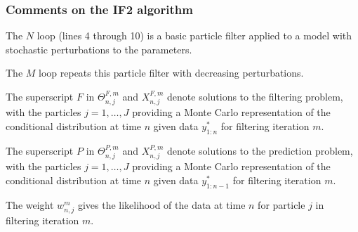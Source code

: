 \documentclass{beamer}\usepackage[]{graphicx}\usepackage[]{color}
\begin{document}
\begin{frame}[fragile]
\frametitle{Comments on the IF2 algorithm}

\bi

\item  The $N$ loop (lines 4 through 10) is a basic particle filter applied to a model with stochastic perturbations to the parameters.

\item  The $M$ loop repeats this particle filter with decreasing perturbations.

\item  The superscript $F$ in $\Theta^{F,m}_{n,j}$ and $X^{F,m}_{n,j}$ denote solutions to the filtering problem, with the particles $j=1,\dots,J$ providing a Monte Carlo representation of the conditional distribution at time $n$ given data $y^*_{1:n}$ for filtering iteration $m$.

\item  The superscript $P$ in $\Theta^{P,m}_{n,j}$ and $X^{P,m}_{n,j}$ denote solutions to the prediction problem, with the particles $j=1,\dots,J$ providing a Monte Carlo representation of the conditional distribution at time $n$ given data $y^*_{1:n-1}$ for filtering iteration $m$.

\item  The weight $w^m_{n,j}$ gives the likelihood of the data at time $n$ for particle $j$ in filtering iteration $m$.

\ei

\end{frame}
\end{document}
